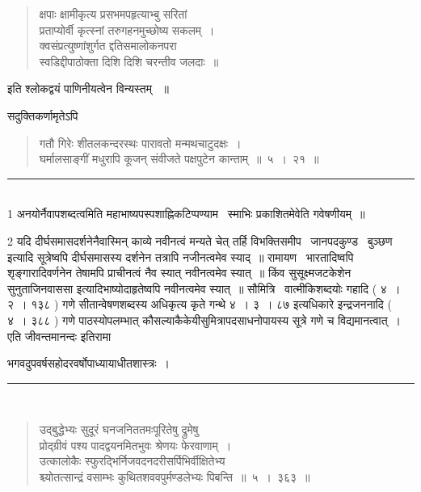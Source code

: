 \documentclass[11pt, openany]{book}
\begin{document}
\begin{multicols}{2}
\begin{quote}
{क्षपाः क्षामीकृत्य प्रसभमपहृत्याभ्बु सरितां \\
प्रताप्योर्वी कृत्स्नां तरुगहनमुच्छोष्य सकलम्~।\\
क्वसंप्रत्युष्णांशुर्गत द्दतिसमालोकनपरा \textendash\ \\
स्वडिद्दीपाठोक्ता दिशि दिशि चरन्तीव जलदाः~॥}
\end{quote}

इति श्लोकद्वयं पाणिनीयत्वेन विन्यस्तम् ~॥ 

सदुक्तिकर्णामृतेऽपि \textendash\ 

\begin{quote}
{\mbh गतौ गिरेः शीतलकन्दरस्थः पारावतो मन्मथचाटुदक्षः~।\\
घर्मालसाङ्गीं मधुरापि कूजन् संवीजते पक्षपुटेन कान्ताम्~॥~५~।~२१~॥}
\end{quote}

\noindent
\rule{1\linewidth}{0.5pt}\\

1 अनयोर्नैवापशब्दत्वमिति महाभाष्यपस्पशाह्निकटिप्पण्याम \textendash\ स्माभिः प्रकाशितमेवेति गवेषणीयम्~॥

2 यदि दीर्घसमासदर्शनेनैवास्मिन् काव्ये नवीनत्वं मन्यते चेत् तर्हि {\qt विभक्तिसमीप \textendash\ जानपदकुण्ड \textendash\ बुञ्छण \textendash\ } इत्यादि सूत्रेष्वपि दीर्घसमासस्य दर्शनेन तत्रापि नजीनत्वमेव स्याद्~॥ रामायण \textendash\ भारतादिष्वपि शृङ्गारादिवर्णनेन तेषामपि प्राचीनत्वं नैव स्यात् नवीनत्वमेव स्यात्~॥ किंव सुसूक्ष्मजटकेशेन सुनुताजिनवाससा इत्यादिभाष्योदाहृतेष्वपि नवीनत्वमेव स्यात्~॥ सौमित्रि \textendash\ वात्मीकिशब्दयोः गहादि ( ४~। २~। १३८ ) गणे सीतान्वेषणशब्दस्य {\qt अधिकृत्य कृते गन्थे ४~। ३~। ८७} इत्यधिकारे इन्द्रजननादि ( ४~। ३८८ ) गणे पाठस्योपलम्भात् कौसल्याकैकेयीसुमित्रापदसाधनोपायस्य सूत्रे गणे च विद्यमानत्वात्~। एति जीवन्तमानन्दः इतिरामा \textendash\

\columnbreak

\noindent
भगवदुपवर्षसहोदरवर्षोपाध्यायाधीतशास्त्रः~।

\noindent
\rule{1\linewidth}{0.5pt}\\

\begin{quote}
{\mbh उद्बुद्धेभ्यः सुदूरं घनजनिततमःपूरितेषु द्रुमेषु\\
प्रोद्ग्रीवं पश्य पादद्वयनमितभुवः श्रेणयः फेरवाणाम्~।\\
उत्कालोकैः स्फुरद्भिर्निजवदनदरीसर्पिभिर्वीक्षितेभ्य \textendash\ \\
श्च्योतत्सान्द्रं वसाम्भः कुथितशववपुर्मण्डलेभ्यः पिबन्ति~॥~५~।~३६३~॥}
\end{quote}


\end{multicols}
\end{document}
